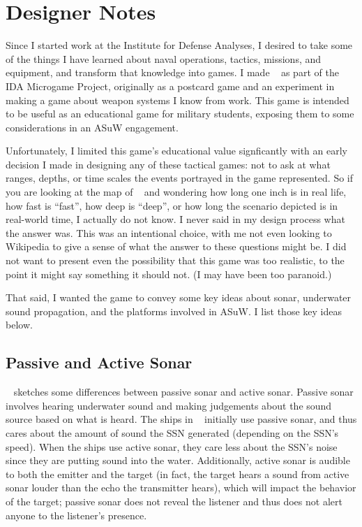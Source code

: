 \documentclass[../TacSubGameRules.tex]{subfiles}
\begin{document}
\section*{Designer Notes}%
\label{sec:designer_notes}

Since I started work at the Institute for Defense Analyses, I desired to take some of the things I have learned about naval operations, tactics, missions, and equipment, and transform that knowledge into games.
I made \gametitle~ as part of the IDA Microgame Project, originally as a postcard game and an experiment in making a game about weapon systems I know from work.
This game is intended to be useful as an educational game for military students, exposing them to some considerations in an ASuW engagement.

Unfortunately, I limited this game's educational value signficantly with an early decision I made in designing any of these tactical games: not to ask at what ranges, depths, or time scales the events portrayed in the game represented.
So if you are looking at the map of \gametitle~ and wondering how long one inch is in real life, how fast is ``fast'', how deep is ``deep'', or how long the scenario depicted is in real-world time, I actually do not know.
I never said in my design process what the answer was.
This was an intentional choice, with me not even looking to Wikipedia to give a sense of what the answer to these questions might be.
I did not want to present even the possibility that this game was too realistic, to the point it might say something it should not.
(I may have been too paranoid.)

That said, I wanted the game to convey some key ideas about sonar, underwater sound propagation, and the platforms involved in ASuW.
I list those key ideas below.

\subsection*{Passive and Active Sonar}%
\label{sub:passive_and_active_sonar}

\gametitle~ sketches some differences between passive sonar and active sonar.
Passive sonar involves hearing underwater sound and making judgements about the sound source based on what is heard.
The ships in \gametitle~ initially use passive sonar, and thus cares about the amount of sound the SSN generated (depending on the SSN's speed).
When the ships use active sonar, they care less about the SSN's noise since they are putting sound into the water.
Additionally, active sonar is audible to both the emitter and the target (in fact, the target hears a sound from active sonar louder than the echo the transmitter hears), which will impact the behavior of the target; passive sonar does not reveal the listener and thus does not alert anyone to the listener's presence.
\end{document}

